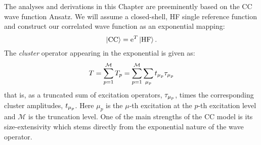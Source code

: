 
The analyses and derivations in this Chapter are preeminently based
on the \acrlong*{CC} wave function Ansatz.
We will assume a closed-shell, \acrshort{HF} single reference function and
construct our correlated wave function as an exponential mapping:
\begin{equation}
  \ket{\mathrm{CC}} = \mathrm{e}^{T}\ket{\mathrm{HF}}.
\end{equation}
The \emph{cluster} operator appearing in the exponential is given as:
\begin{equation}
  T = \sum_{p=1}^\mathcal{M} T_p = \sum_{p=1}^\mathcal{M}\sum_{\mu_p}t_{\mu_p}\tau_{\mu_p}
\end{equation}
that is, as a truncated sum of excitation operators, $\tau_{\mu_p}$,
times the corresponding cluster amplitudes, $t_{\mu_p}$.
Here $\mu_p$ is the $\mu$-th excitation at the $p$-th excitation level and
$\mathcal{M}$ is the truncation level.
One of the main strengths of the \acrshort{CC} model is its size-extensivity
which stems directly from the exponential nature of the wave
operator.~\autocite{Shavitt2009-mr, Helgaker2000-tz}

